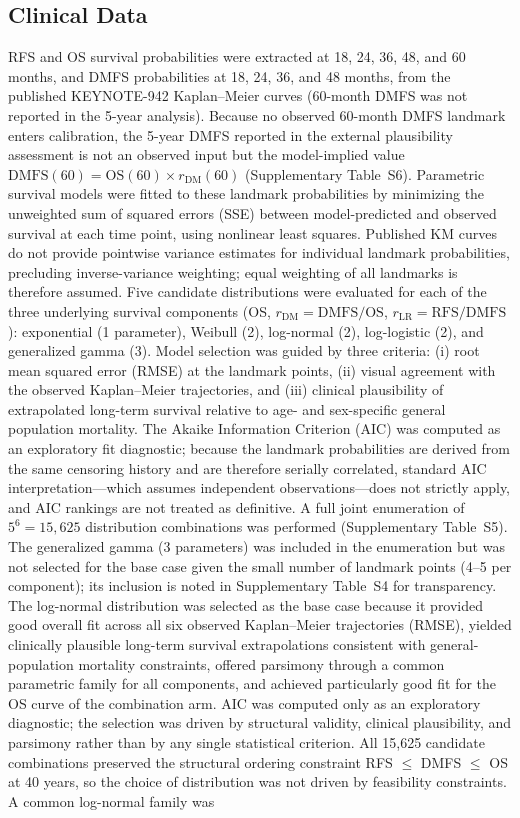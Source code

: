 \documentclass[12pt,a4paper]{article}
\begin{document}
\subsection{Clinical Data}

RFS and OS survival probabilities were extracted at 18, 24, 36, 48, and 60 months, and DMFS probabilities at 18, 24, 36, and 48 months, from the published \mbox{KEYNOTE-942} Kaplan--Meier curves \cite{khattak2026} (60-month DMFS was not reported in the 5-year analysis). Because no observed 60-month DMFS landmark enters calibration, the 5-year DMFS reported in the external plausibility assessment is not an observed input but the model-implied value $\text{DMFS}(60)=\text{OS}(60)\times r_{\text{DM}}(60)$ (Supplementary Table~S6). Parametric survival models were fitted to these landmark probabilities by minimizing the unweighted sum of squared errors (SSE) between model-predicted and observed survival at each time point, using nonlinear least squares. Published KM curves do not provide pointwise variance estimates for individual landmark probabilities, precluding inverse-variance weighting; equal weighting of all landmarks is therefore assumed. Five candidate distributions were evaluated for each of the three underlying survival components (OS, $r_{\text{DM}} = \text{DMFS}/\text{OS}$, $r_{\text{LR}} = \text{RFS}/\text{DMFS}$): exponential (1 parameter), Weibull (2), log-normal (2), log-logistic (2), and generalized gamma (3). Model selection was guided by three criteria: (i) root mean squared error (RMSE) at the landmark points, (ii) visual agreement with the observed Kaplan--Meier trajectories, and (iii) clinical plausibility of extrapolated long-term survival relative to age- and sex-specific general population mortality. The Akaike Information Criterion (AIC) was computed as an exploratory fit diagnostic; because the landmark probabilities are derived from the same censoring history and are therefore serially correlated, standard AIC interpretation---which assumes independent observations---does not strictly apply, and AIC rankings are not treated as definitive. A full joint enumeration of $5^6 = 15,625$ distribution combinations was performed (Supplementary Table~S5). The generalized gamma (3 parameters) was included in the enumeration but was not selected for the base case given the small number of landmark points (4--5 per component); its inclusion is noted in Supplementary Table~S4 for transparency. The log-normal distribution was selected as the base case because it provided good overall fit across all six observed Kaplan--Meier trajectories (RMSE), yielded clinically plausible long-term survival extrapolations consistent with general-population mortality constraints, offered parsimony through a common parametric family for all components, and achieved particularly good fit for the OS curve of the combination arm. AIC was computed only as an exploratory diagnostic; the selection was driven by structural validity, clinical plausibility, and parsimony rather than by any single statistical criterion. All 15,625 candidate combinations preserved the structural ordering constraint RFS $\leq$ DMFS $\leq$ OS at 40 years, so the choice of distribution was not driven by feasibility constraints. A common log-normal family was 
\end{document}
